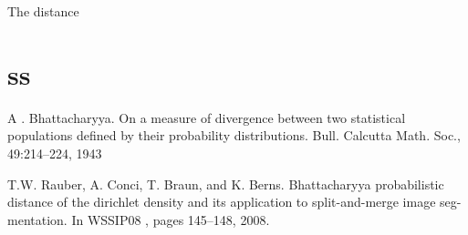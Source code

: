The distance

\section{ss}


A . Bhattacharyya.  On  a  measure  of  divergence  between two  statistical populations  defined  by  their  probability distributions.    Bull.  Calcutta Math.  Soc.,  49:214–224, 1943

T.W. Rauber, A. Conci, T. Braun, and K. Berns. Bhattacharyya probabilistic distance of the dirichlet density and its application to split-and-merge image seg- mentation. In WSSIP08 , pages 145–148, 2008. 


